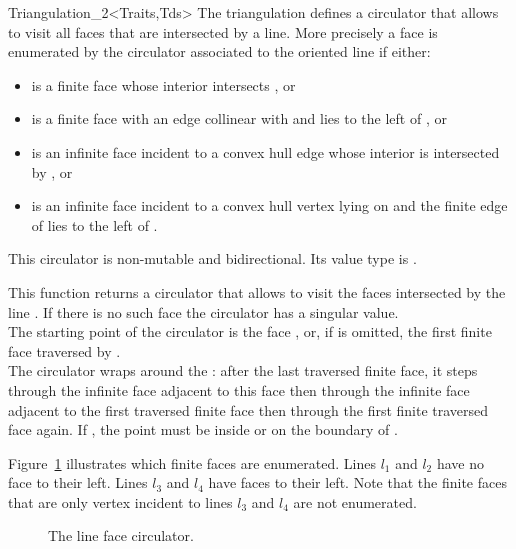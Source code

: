 \begin{ccClassTemplate}{Triangulation_2<Traits,Tds>}
The triangulation defines a circulator that allows
to visit all faces that are intersected by a line. 
More precisely a face   is enumerated by the circulator 
associated to the oriented line  if either:
\begin{itemize}\ccTexHtml{\itemsep0pt}{}
\item 
{} is a finite face whose interior intersects , or
\item
  is a finite face with  an edge collinear with  and lies
to the left of , or
\item
{} is an infinite face incident to a  convex hull edge 
whose interior is intersected
by , or
\item
{} is an infinite face incident to a  convex hull vertex
lying on   and the finite edge of 
lies to the left of . 
\end{itemize}
This circulator is
non-mutable and bidirectional. Its value type is .

{ This function returns a circulator that allows to visit the 
 faces intersected by the line . 
If there is no such face the circulator has a singular value.\\
 The starting point of the circulator is the face , or, if
  is omitted,  the first finite face traversed by . \\
  The circulator wraps around the  :
after the last traversed finite face, it steps through the infinite face adjacent
to this face then through the infinite face adjacent to the first
traversed finite face then through the first finite traversed face again.
\ccPrecond If , the point  must be
inside or on the boundary of .}

Figure~\ref{I1_fig_Line_face_circulator} illustrates which finite faces are enumerated. Lines
$l_1$ and $l_2$ have no face to their left. Lines $l_3$ and $l_4$
have faces to their left. Note that the finite faces that are only vertex
incident to lines $l_3$ and  $l_4$ are not enumerated.

\begin{figure}
\begin{ccTexOnly}
\begin{center}   \end{center}
\end{ccTexOnly} 
\caption{The line face circulator.
\label{I1_fig_Line_face_circulator}}


\end{figure}
\end{ccClassTemplate}
